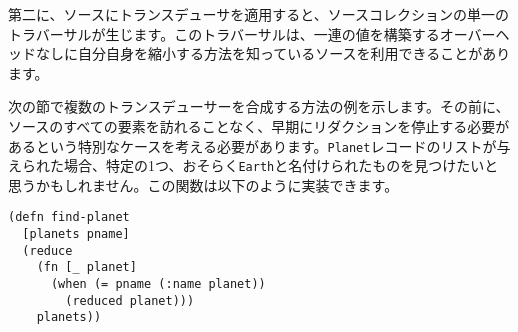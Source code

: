 第二に、ソースにトランスデューサを適用すると、ソースコレクションの単一のトラバーサルが生じます。このトラバーサルは、一連の値を構築するオーバーヘッドなしに自分自身を縮小する方法を知っているソースを利用できることがあります。

次の節で複数のトランスデューサーを合成する方法の例を示します。その前に、ソースのすべての要素を訪れることなく、早期にリダクションを停止する必要があるという特別なケースを考える必要があります。\texttt{Planet}レコードのリストが与えられた場合、特定の1つ、おそらく\texttt{Earth}と名付けられたものを見つけたいと思うかもしれません。この関数は以下のように実装できます。




\begin{lstlisting}[numbers=none]
(defn find-planet
  [planets pname]
  (reduce
    (fn [_ planet]
      (when (= pname (:name planet))
        (reduced planet)))
    planets))
\end{lstlisting}






